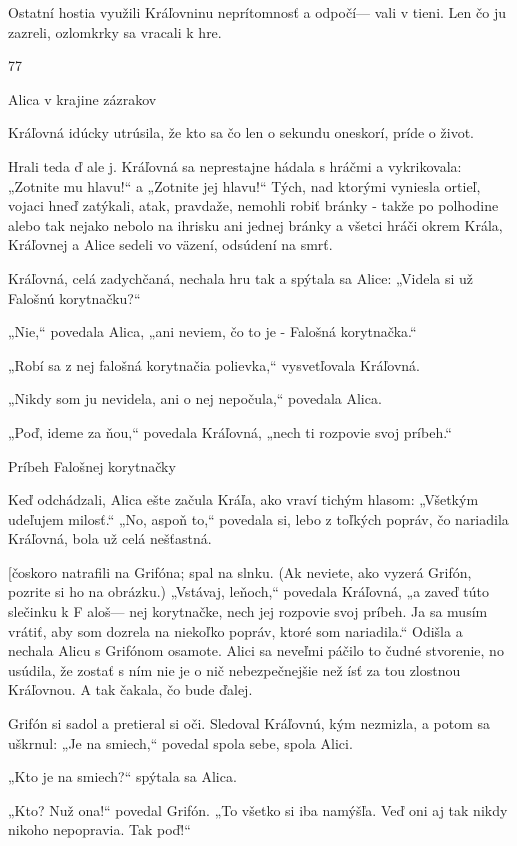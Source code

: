 \documentclass[12pt]{book}
\begin{document}
\begin{Parallel}[p]{}{}
{Ostatní hostia využili Kráľovninu neprítomnosť a odpočí—
vali v tieni. Len čo ju zazreli, ozlomkrky sa vracali k hre.

77

Alica v krajine zázrakov

Kráľovná idúcky utrúsila, že kto sa čo len o sekundu
oneskorí, príde o život.

Hrali teda ď ale j. Kráľovná sa neprestajne hádala s hráčmi
a vykrikovala: „Zotnite mu hlavu!“ a „Zotnite jej hlavu!“
Tých, nad ktorými vyniesla ortieľ, vojaci hneď zatýkali,
atak, pravdaže, nemohli robiť bránky - takže po polhodine
alebo tak nejako nebolo na ihrisku ani jednej bránky a všetci
hráči okrem Krála, Kráľovnej a Alice sedeli vo väzení,
odsúdení na smrť.

Kráľovná, celá zadychčaná, nechala hru tak a spýtala sa
Alice: „Videla si už Falošnú korytnačku?“

„Nie,“ povedala Alica, „ani neviem, čo to je - Falošná
korytnačka.“

„Robí sa z nej falošná korytnačia polievka,“ vysvetľovala
Kráľovná.

„Nikdy som ju nevidela, ani o nej nepočula,“ povedala
Alica.

„Poď, ideme za ňou,“ povedala Kráľovná, „nech ti
rozpovie svoj príbeh.“

 

Príbeh Falošnej korytnačky

Keď odchádzali, Alica ešte začula Kráľa, ako vraví tichým
hlasom: „Všetkým udeľujem milosť.“ „No, aspoň to,“
povedala si, lebo z toľkých popráv, čo nariadila Kráľovná,
bola už celá nešťastná.

[čoskoro natrafili na Grifóna; spal na slnku. (Ak neviete,
ako vyzerá Grifón, pozrite si ho na obrázku.) „Vstávaj,
leňoch,“ povedala Kráľovná, „a zaveď túto slečinku k F aloš—
nej korytnačke, nech jej rozpovie svoj príbeh. Ja sa musím
vrátiť, aby som dozrela na niekoľko popráv, ktoré som
nariadila.“ Odišla a nechala Alicu s Grifónom osamote.
Alici sa neveľmi páčilo to čudné stvorenie, no usúdila, že
zostať s ním nie je o nič nebezpečnejšie než ísť za tou
zlostnou Kráľovnou. A tak čakala, čo bude ďalej.

Grifón si sadol a pretieral si oči. Sledoval Kráľovnú, kým
nezmizla, a potom sa uškrnul: „Je na smiech,“ povedal
spola sebe, spola Alici.

„Kto je na smiech?“ spýtala sa Alica.

„Kto? Nuž ona!“ povedal Grifón. „To všetko si iba
namýšľa. Veď oni aj tak nikdy nikoho nepopravia. Tak
poď!“

}
\end{Parallel}
\end{document}
